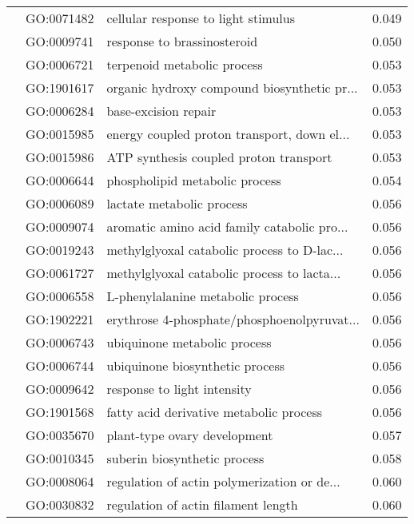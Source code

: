 \begin{longtable}{lllr}
   & GO:0071482 &          cellular response to light stimulus &         0.049 \\
   & GO:0009741 &                  response to brassinosteroid &         0.050 \\
   & GO:0006721 &                  terpenoid metabolic process &         0.053 \\
   & GO:1901617 &  organic hydroxy compound biosynthetic pr... &         0.053 \\
   & GO:0006284 &                         base-excision repair &         0.053 \\
   & GO:0015985 &  energy coupled proton transport, down el... &         0.053 \\
   & GO:0015986 &       ATP synthesis coupled proton transport &         0.053 \\
   & GO:0006644 &               phospholipid metabolic process &         0.054 \\
   & GO:0006089 &                    lactate metabolic process &         0.056 \\
   & GO:0009074 &  aromatic amino acid family catabolic pro... &         0.056 \\
   & GO:0019243 &  methylglyoxal catabolic process to D-lac... &         0.056 \\
   & GO:0061727 &  methylglyoxal catabolic process to lacta... &         0.056 \\
   & GO:0006558 &            L-phenylalanine metabolic process &         0.056 \\
   & GO:1902221 &  erythrose 4-phosphate/phosphoenolpyruvat... &         0.056 \\
   & GO:0006743 &                 ubiquinone metabolic process &         0.056 \\
   & GO:0006744 &              ubiquinone biosynthetic process &         0.056 \\
   & GO:0009642 &                  response to light intensity &         0.056 \\
   & GO:1901568 &      fatty acid derivative metabolic process &         0.056 \\
   & GO:0035670 &                 plant-type ovary development &         0.057 \\
   & GO:0010345 &                 suberin biosynthetic process &         0.058 \\
   & GO:0008064 &  regulation of actin polymerization or de... &         0.060 \\
   & GO:0030832 &          regulation of actin filament length &         0.060 \\

\end{longtable}
